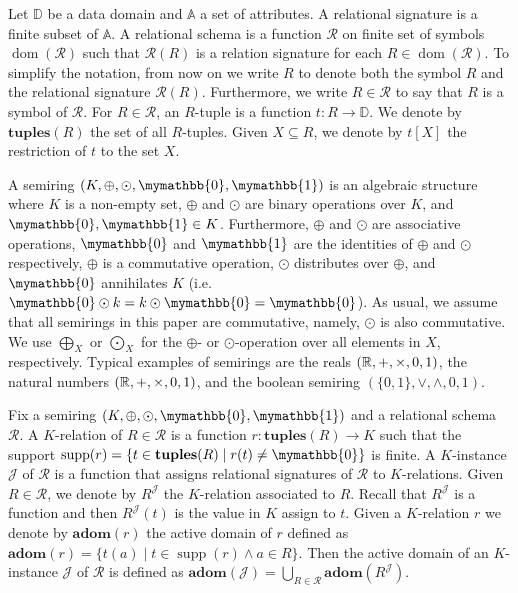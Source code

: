 \newcommand{\ddom}{\mathbb{D}}
\newcommand{\fdom}{\operatorname{dom}}
\newcommand{\att}{\mathbb{A}}
\newcommand{\tuples}{\mathbf{tuples}}
\newcommand{\supp}{\operatorname{supp}}
\newcommand{\cJ}{\mathcal{J}}
\newcommand{\cR}{\mathcal{R}}
\newcommand{\adom}{\mathbf{adom}}

\newcommand{\ksum}{\oplus}
\newcommand{\kprod}{\odot}
\newcommand{\bigksum}{\bigoplus}
\newcommand{\bigkprod}{\bigodot}
\newcommand{\kzero}{\mymathbb{0}}
\newcommand{\kone}{\mymathbb{1}}

\newcommand{\row}{\mathsf{row}}
\newcommand{\rows}{\mathsf{rows}}
\newcommand{\col}{\mathsf{col}}
\newcommand{\cols}{\mathsf{cols}}
\newcommand{\arae}{Q}


Let $\ddom$ be a data domain and $\att$ a set of attributes. A relational signature is a finite subset of $\att$. A relational schema is a function $\cR$ on finite set of symbols $\fdom(\cR)$ such that $\cR(R)$ is a relation signature for each $R \in \fdom(\cR)$. To simplify the notation, from now on we write $R$ to denote both the symbol $R$ and the relational signature $\cR(R)$.
Furthermore, we write $R \in \cR$ to say that $R$ is a symbol of $\cR$. 
For $R \in \cR$, an $R$-tuple is a function $t: R \rightarrow \ddom$. We denote by $\tuples(R)$ the set of all $R$-tuples. Given $X \subseteq R$, we denote by $t[X]$ the restriction of $t$ to the set $X$.

A semiring $(K, \ksum, \kprod, \kzero, \kone)$ is an algebraic structure where $K$ is a non-empty set, $\ksum$ and $\kprod$ are binary operations over $K$, and $\kzero, \kone \in K$. Furthermore,  $\ksum$ and $\kprod$ are associative operations, $\kzero$ and $\kone$ are the identities of $\ksum$ and $\kprod$ respectively, $\ksum$ is a commutative operation, $\kprod$ distributes over $\ksum$, and $\kzero$ annihilates $K$ (i.e. $\kzero \kprod k = k \kprod \kzero = \kzero$). As usual, we assume that all semirings in this paper are commutative, namely, $\kprod$ is also commutative. We use $\bigksum_X$ or $\bigkprod_X$ for the $\ksum$- or $\kprod$-operation over all elements in $X$, respectively. Typical examples of semirings are the reals $(\mathbb{R}, +, \times, 0,1)$, the natural numbers $(\mathbb{R}, +, \times, 0,1)$, and the boolean semiring $(\{0,1\}, \vee, \wedge, 0, 1)$. 

Fix a semiring $(K, \ksum, \kprod, \kzero, \kone)$ and a relational schema $\cR$. A $K$-relation of $R \in \cR$ is a function $r: \tuples(R) \rightarrow K$ such that the support  $\supp(r) = \{t \in \tuples(R) \mid r(t) \neq \kzero\}$ is finite. 
A $K$-instance $\cJ$ of $\cR$ is a function that assigns relational signatures of $\cR$ to $K$-relations. Given $R \in \cR$, we denote by $R^\cJ$ the $K$-relation associated to $R$. Recall that $R^\cJ$ is a function and then $R^\cJ(t)$ is the value in $K$ assign to $t$. 
Given a $K$-relation $r$ we denote by $\adom(r)$ the active domain of $r$ defined as $\adom(r) = \{t(a) \mid t \in \supp(r) \wedge a \in R\}$.
Then the active domain of an $K$-instance $\cJ$ of $\cR$ is defined as $\adom(\cJ) = \bigcup_{R \in \cR} \adom(R^\cJ)$. 

